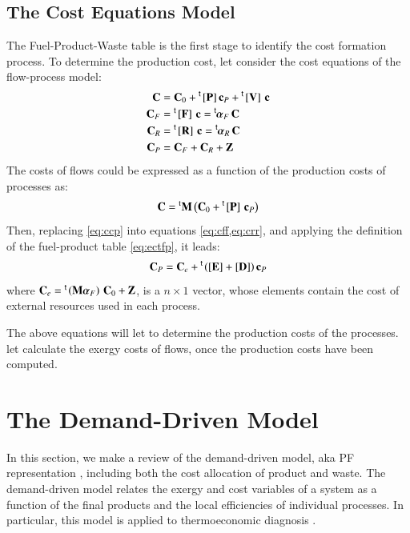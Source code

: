 \documentclass{ecos2018}
\begin{document}
\subsection{The Cost Equations Model}
The Fuel-Product-Waste table is the first stage to identify the cost formation process. To determine the production cost, let consider the cost equations of the flow-process model:
\begin{align}
\mathbf{C}&=\mathbf{C}_0+\prescript{\smash{\mathsf{t}}}{}{\mskip-1mu}\left[ \textbf{P} \right]\mathbf{c}_P+\prescript{\smash{\mathsf{t}}}{}{\mskip-1mu}\left[ \textbf{V} \right]\,\mathbf{c} \\
\mathbf{C}_F&=\prescript{\smash{\mathsf{t}}}{}{\mskip-1mu}\left[ \textbf{F} \right]\,\mathbf{c}=\prescript{\smash{\mathsf{t}}}{}{\mskip-1mu}\bm{\alpha}_F\,\mathbf{C} \label{eq:cff} \\
\mathbf{C}_R&=\prescript{\smash{\mathsf{t}}}{}{\mskip-1mu}\left[ \textbf{R} \right]\,\mathbf{c} = \prescript{\smash{\mathsf{t}}}{}{\mskip-1mu}\bm{\alpha}_R\,\mathbf{C} \label{eq:crr} \\
\mathbf{C}_P&=\mathbf{C}_F+\mathbf{C}_R+\mathbf{Z}
\end{align}
The costs of flows could be expressed as a function of the production costs of processes as:
\begin{equation}
\label{eq:ccp}
\mathbf{C}=\prescript{\smash{\mathrm{t}}}{}{\mathbf{M}}\left(\mathbf{C}_0 + \prescript{\smash{\mathsf{t}}}{}{\mskip-1mu}\left[ \textbf{P} \right]\,\mathbf{c}_P\right)
\end{equation}
Then, replacing \cref{eq:ccp} into equations \cref{eq:cff,eq:crr}, and applying the definition of the fuel-product table \eqref{eq:ectfp}, it leads:
\begin{equation}
\label{eq:CPt}
\mathbf{C}_P=\mathbf{C}_e + \prescript{\smash{\mathsf{t}}}{}{\mskip-1mu}\left(\left[ \textbf{E} \right]+\left[ \textbf{D} \right]\right) \mathbf{c}_P
\end{equation}
where $\mathbf{C}_e= \prescript{\smash{\mathsf{t}}}{}{\mskip-1mu}\left(\mathbf{M} \bm{\alpha}_F \right) \, \mathbf{C}_0 + \mathbf{Z}$, is a $n\times 1$ vector, whose elements contain the cost of external resources used in each process.

The above equations will let to determine the production costs of the processes.  let calculate the exergy costs of flows, once the production costs have been computed.

\section{The Demand-Driven Model}
In this section, we make a review of the demand-driven model, aka PF representation \cite{Torres09}, including both the cost allocation of product and waste.
The demand-driven model relates the exergy and cost variables of a system as a function of the final products and the local efficiencies of individual processes. In particular, this model is applied to thermoeconomic diagnosis \cite{TADEUS2004}.
\end{document}
